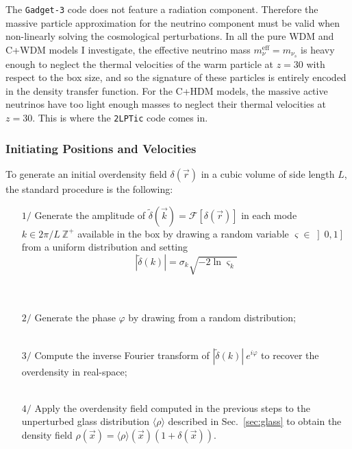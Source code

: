 The \texttt{Gadget-3} code does not feature a radiation component. Therefore the massive particle approximation for the neutrino component must be valid when non-linearly solving the cosmological perturbations. In all the pure WDM and C+WDM models I investigate, the effective neutrino mass $m_\nu^{\mathrm{eff}} = m_{\nu_s}$ is heavy enough to neglect the thermal velocities of the warm particle at $z=30$ with respect to the box size, and so the signature of these particles is entirely encoded in the density transfer function. For the C+HDM models, the massive active neutrinos have too light enough masses to neglect their thermal velocities at $z=30$. This is where the \texttt{2LPTic} code comes in. \\




\subsubsection{Initiating Positions and Velocities}

To generate an initial overdensity field $\delta(\vec{r})$ in a cubic volume of side length $L$, the standard procedure is the following:\\
\begin{itemize}
\item[$1 /$] Generate the amplitude of $\tilde{\delta}(\vec{k}) = \mathcal{F} \left[ \delta(\vec{r}) \right]$ in each mode $k \in 2 \pi / L ~\mathbb{Z}^{+}$ available in the box by drawing a random variable $\varsigma \in \left] 0, 1 \right]$ from a uniform distribution and setting 
\begin{equation}
\left\vert \tilde{\delta} (k) \right\vert = \sigma_k \sqrt{-2 \ln \varsigma_k}
\end{equation}\\
\\
\item[$2 /$] Generate the phase $\varphi$ by drawing from a random distribution; \\
\\
\item[$3 /$] Compute the inverse Fourier transform of $\left\vert \tilde{\delta} (k) \right\vert~e^{i \varphi}$ to recover the overdensity in real-space; \\
\\
\item[$4 /$] Apply the overdensity field computed in the previous steps to the unperturbed glass distribution $\langle \rho \rangle$ described in Sec.~\ref{sec:glass} to obtain the density field $\rho(\vec{x}) = \langle \rho \rangle (\vec{x}) \left( 1 + \delta (\vec{x}) \right)$. \\
\end{itemize}

